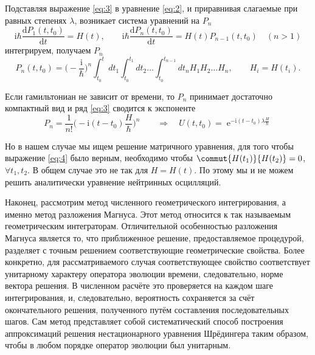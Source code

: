\documentclass[a4paper,12pt]{article}
\newcommand{\dd}{\mathrm{d}}
\renewcommand{\exp}{\operatorname{e}}
\renewcommand{\imath}{\mathrm{i}}
\begin{document}
Подставляя выражение \eqref{eq:3} в уравнение \eqref{eq:2}, и приравнивая
слагаемые при равных степенях \(\lambda\), возникает система уравнений на
\(P_{n}\)
\begin{equation*}
		\imath\hbar\frac{\dd P_{1}(t,t_{0})}{\dd t}= H(t),\qquad
			\imath\hbar\frac{\dd P_{n}(t,t_{0})}{\dd t}= H(t)P_{n-1}(t,t_{0})\quad
			(n>1)
\end{equation*}
интегрируем, получаем \(P_{n}\)
\begin{equation}\label{eq:4}
	P_{n}(t,t_{0})=\Big(-\frac{\imath}{\hbar}\Big)^{n}
  \int_{t_{0}}^{t}dt_{1}\int_{t_{0}}^{t_{1}}dt_{2}\ldots
  \int_{t_{0}}^{t_{n-1}}dt_{n}H_{1}H_{2}\ldots H_{n},\qquad
	H_{i}=H(t_{i}).
\end{equation}

Если гамильтониан не зависит от времени, то \(P_{n}\) принимает достаточно
компактный вид и ряд \eqref{eq:3} сводится к экспоненте
\begin{equation}
	P_{n}=\frac{1}{n!}\bigg(-\imath(t-t_{0})\frac{H}{\hbar}\bigg)^{n}\qquad
	\Longrightarrow\quad
	U(t,t_{0})=\exp^{-\imath(t-t_{0})\lambda\frac{H}{\hbar}}
\end{equation}

Но в нашем случае мы ищем решение матричного уравнения, для того чтобы выражение
\eqref{eq:4} было верным, необходимо чтобы \(\commut{H(t_{1})}{H(t_{2})}=0\),
\(\forall t_{1},t_{2}.\) В общем случае это не так для \(H=H(t)\). По этому мы и
не можем решить аналитически уравнение нейтринных осцилляций.

Наконец, рассмотрим метод численного геометрического интегрирования, а именно метод 
разложения Магнуса. 
Этот метод относится к так
называемым геометрическим интеграторам. Отличительной особенностью разложения
Магнуса является то, что приближенное решение, предоставляемое процедурой,
разделяет с точным решением соответствующие геометрические свойства. Более
конкретно, для рассматриваемого случая соответствующее свойство соответствует
унитарному характеру оператора эволюции времени, следовательно, норме вектора
решения. В численном расчёте это проверяется на каждом шаге интегрирования, и,
следовательно, вероятность сохраняется за счёт окончательного решения,
полученного путём составления последовательных шагов. Сам метод представляет
собой систематический способ построения аппроксимаций решения нестационарного
уравнения Шрёдингера таким образом, чтобы в любом порядке оператор эволюции был
унитарным.
\end{document}
